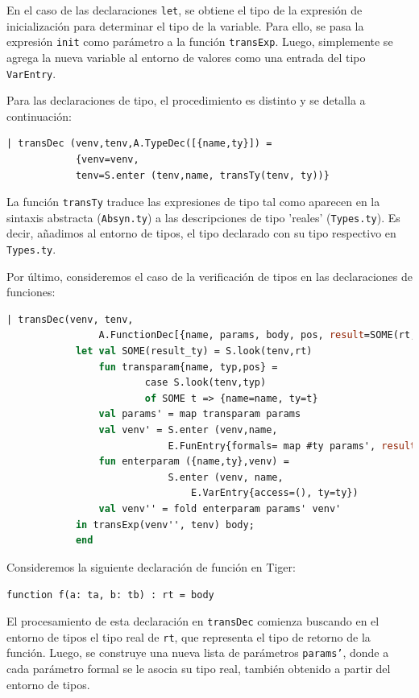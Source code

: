 \documentclass[runningheads]{llncs}
\begin{document}
En el caso de las declaraciones \texttt{let}, se obtiene el tipo de la expresión de inicialización para determinar el tipo de la variable. Para ello, se pasa la expresión \texttt{init} como parámetro a la función \texttt{transExp}. Luego, simplemente se agrega la nueva variable al entorno de valores como una entrada del tipo \texttt{VarEntry}.

Para las declaraciones de tipo, el procedimiento es distinto y se detalla a continuación:

\begin{lstlisting}[language=ML, caption={Chequeo de tipos}, captionpos=b]
      | transDec (venv,tenv,A.TypeDec([{name,ty}]) =
            {venv=venv,
            tenv=S.enter (tenv,name, transTy(tenv, ty))}
\end{lstlisting}

La función \texttt{transTy} traduce las expresiones de tipo tal como aparecen en la sintaxis abstracta (\texttt{Absyn.ty}) a las descripciones de tipo 'reales' (\texttt{Types.ty}). Es decir, añadimos al entorno de tipos, el tipo declarado con su tipo respectivo en \texttt{Types.ty}.

Por último, consideremos el caso de la verificación de tipos en las declaraciones de funciones:

\begin{lstlisting}[language=ML, caption={Caso \texttt{TypeDec} en la función \texttt{transDec} que actualiza el entorno de tipos}, captionpos=b]
      | transDec(venv, tenv,
                A.FunctionDec[{name, params, body, pos, result=SOME(rt,pos)}]) =
            let val SOME(result_ty) = S.look(tenv,rt)
                fun transparam{name, typ,pos} =
                        case S.look(tenv,typ)
                        of SOME t => {name=name, ty=t}
                val params' = map transparam params
                val venv' = S.enter (venv,name,
                            E.FunEntry{formals= map #ty params', result=result_ty})
                fun enterparam ({name,ty},venv) =
                            S.enter (venv, name,
                                E.VarEntry{access=(), ty=ty})
                val venv'' = fold enterparam params' venv'
            in transExp(venv'', tenv) body;
            end
\end{lstlisting}
Consideremos la siguiente declaración de función en Tiger:

\texttt{function f(a: ta, b: tb) : rt = body}

El procesamiento de esta declaración en \texttt{transDec} comienza buscando en el entorno de tipos el tipo real de \texttt{rt}, que representa el tipo de retorno de la función. Luego, se construye una nueva lista de parámetros \texttt{params'}, donde a cada parámetro formal se le asocia su tipo real, también obtenido a partir del entorno de tipos.
\end{document}

